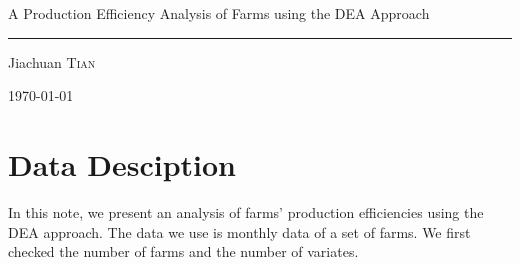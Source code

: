 \documentclass[12pt,]{article}
\begin{document}
\begin{titlepage}
\begin{center}

\vspace*{5em}
{\huge A Production Efficiency Analysis of Farms using the DEA Approach\\[0.4cm] }
\color{blue}\hrule
\color{black}
\vspace{100mm}
\noindent
\Large Jiachuan \textsc{Tian}

\today
\vfill
\end{center}
\end{titlepage}


\section{Data Desciption}


In this note, we present an analysis of farms' production efficiencies using the DEA approach. The data we use is monthly data of a set of farms. We first checked the number of farms and the number of variates.
\end{document}

